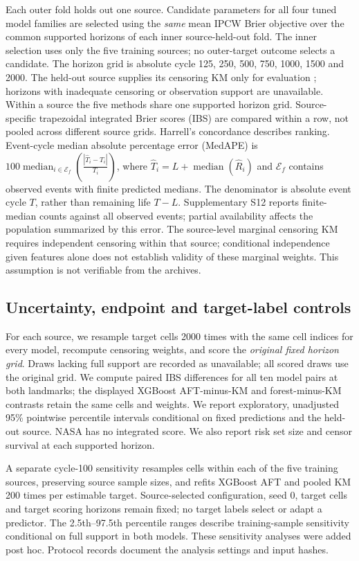 \documentclass[preprint,12pt]{elsarticle}
\begin{document}
Each outer fold holds out one source. Candidate parameters for all four tuned model families are selected using the \emph{same} mean IPCW Brier objective over the common supported horizons of each inner source-held-out fold. The inner selection uses only the five training sources; no outer-target outcome selects a candidate. The horizon grid is absolute cycle 125, 250, 500, 750, 1000, 1500 and 2000. The held-out source supplies its censoring KM only for evaluation \citep{gerds2006}; horizons with inadequate censoring or observation support are unavailable. Within a source the five methods share one supported horizon grid. Source-specific trapezoidal integrated Brier scores (IBS) are compared within a row, not pooled across different source grids. Harrell's concordance \citep{harrell1982} describes ranking. Event-cycle median absolute percentage error (MedAPE) is $100\operatorname{median}_{i\in\mathcal E_f}\left(\frac{|\widehat T_i-T_i|}{T_i}\right)$, where $\widehat T_i=L+\operatorname{median}(\widehat R_i)$ and $\mathcal E_f$ contains observed events with finite predicted medians. The denominator is absolute event cycle $T$, rather than remaining life $T-L$. Supplementary S12 reports finite-median counts against all observed events; partial availability affects the population summarized by this error. The source-level marginal censoring KM requires independent censoring within that source; conditional independence given features alone does not establish validity of these marginal weights. This assumption is not verifiable from the archives.

\subsection{Uncertainty, endpoint and target-label controls}
For each source, we resample target cells 2000 times with the same cell indices for every model, recompute censoring weights, and score the \emph{original fixed horizon grid}. Draws lacking full support are recorded as unavailable; all scored draws use the original grid. We compute paired IBS differences for all ten model pairs at both landmarks; the displayed XGBoost AFT-minus-KM and forest-minus-KM contrasts retain the same cells and weights. We report exploratory, unadjusted 95\% pointwise percentile intervals conditional on fixed predictions and the held-out source. NASA has no integrated score. We also report risk set size and censor survival at each supported horizon.

A separate cycle-100 sensitivity resamples cells within each of the five training sources, preserving source sample sizes, and refits XGBoost AFT and pooled KM 200 times per estimable target. Source-selected configuration, seed 0, target cells and target scoring horizons remain fixed; no target labels select or adapt a predictor. The 2.5th--97.5th percentile ranges describe training-sample sensitivity conditional on full support in both models. These sensitivity analyses were added post hoc. Protocol records document the analysis settings and input hashes.
\end{document}
